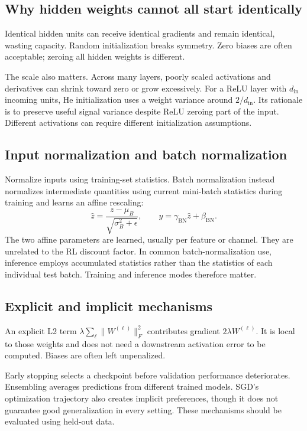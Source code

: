 \documentclass[11pt]{article}
\begin{document}
\subsection{Why hidden weights cannot all start identically}
Identical hidden units can receive identical gradients and remain identical, wasting capacity. Random initialization breaks symmetry. Zero biases are often acceptable; zeroing all hidden weights is different.

The scale also matters. Across many layers, poorly scaled activations and derivatives can shrink toward zero or grow excessively. For a ReLU layer with $d_{\mathrm{in}}$ incoming units, He initialization uses a weight variance around $2/d_{\mathrm{in}}$. Its rationale is to preserve useful signal variance despite ReLU zeroing part of the input. Different activations can require different initialization assumptions.
\subsection{Input normalization and batch normalization}
Normalize inputs using training-set statistics. Batch normalization instead normalizes intermediate quantities using current mini-batch statistics during training and learns an affine rescaling:
\[
\hat z=\frac{z-\mu_B}{\sqrt{\sigma_B^2+\epsilon}},\qquad
y=\gamma_{\mathrm{BN}}\hat z+\beta_{\mathrm{BN}}.
\]
The two affine parameters are learned, usually per feature or channel. They are unrelated to the RL discount factor. In common batch-normalization use, inference employs accumulated statistics rather than the statistics of each individual test batch. Training and inference modes therefore matter.
\subsection{Explicit and implicit mechanisms}
An explicit L2 term $\lambda\sum_\ell\|W^{(\ell)}\|_F^2$ contributes gradient $2\lambda W^{(\ell)}$. It is local to those weights and does not need a downstream activation error to be computed. Biases are often left unpenalized.

Early stopping selects a checkpoint before validation performance deteriorates. Ensembling averages predictions from different trained models. SGD's optimization trajectory also creates implicit preferences, though it does not guarantee good generalization in every setting. These mechanisms should be evaluated using held-out data.
\end{document}
